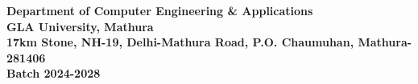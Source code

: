 \begin{titlepage}
\begin{center}
        \vfill
        \large
        \textbf{Department of Computer Engineering \& Applications}\\
        \textbf{GLA University, Mathura}\\
        \normalsize
        \textbf{17km Stone, NH-19, Delhi-Mathura Road, P.O. Chaumuhan, Mathura-281406}\\
        \vspace{0.35cm}
        \large
        \textbf{Batch 2024-2028}
    \end{center}
\end{titlepage}
